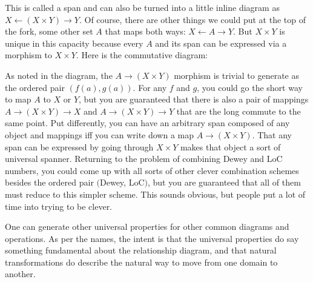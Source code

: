\documentclass[11pt]{article}
\begin{document}

This is called a span and can also be turned into a little inline diagram as
$X \leftarrow (X\times Y) \rightarrow Y$.
Of course, there are other things we could put at the top of the fork, some other
set $A$ that maps both ways: $X \leftarrow A \rightarrow Y$.
But $X\times Y$ is unique in this capacity because every $A$ and its span can be expressed
via a morphism to $X\times Y$. Here is the commutative diagram:


As noted in the diagram, the $A\to (X\times Y)$ morphism is trivial to generate as
the ordered pair $(f(a), g(a))$.  For any $f$ and $g$, you could go the short way to
map $A$ to $X$ or $Y$, but you are guaranteed that there is also a pair of mappings
$A\to (X\times Y) \to X$ and $A\to (X\times Y) \to Y$ that are the long commute to the
same point.  Put differently, you can have an arbitrary span composed of any object and
mappings iff you can write down a map $A\to (X\times Y)$. That any span can be expressed
by going through $X\times Y$ makes that object a sort of universal spanner. Returning
to the problem of combining Dewey and LoC numbers, you could come up with all sorts
of other clever combination schemes besides the ordered pair $($Dewey, LoC$)$, but
you are guaranteed that all of them must reduce to this simpler scheme. This sounds
obvious, but people put a lot of time into trying to be clever.

One can generate other universal properties for other common diagrams and operations.
As per the names, the intent is that the universal properties do say something fundamental
about the relationship diagram, and that natural transformations do describe the
natural way to move from one domain to another.

\nocite{awodey:category}
\nocite{riehl:category}
\nocite{lawvere:conceptual}


\end{document}
